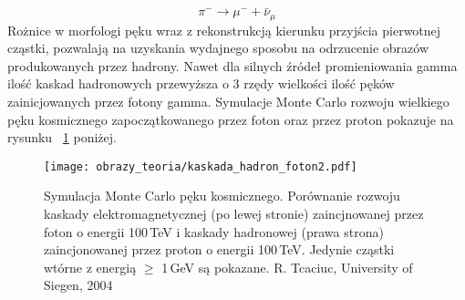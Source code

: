\documentclass[a4paper,11pt,twoside]{article}
\begin{document}
\begin{equation*}
\pi^- \rightarrow \mu^- + \bar{\nu}_{\mu}
\end{equation*}
Rożnice w morfologi pęku wraz z rekonstrukcją kierunku przyjścia pierwotnej cząstki, pozwalają na uzyskania wydajnego sposobu na odrzucenie obrazów produkowanych przez hadrony. Nawet dla silnych źródeł promieniowania gamma ilość kaskad hadronowych przewyższa o 3 rzędy wielkości ilość pęków zainicjowanych przez fotony gamma. Symulacje Monte Carlo rozwoju wielkiego pęku kosmicznego zapoczątkowanego przez foton oraz przez proton pokazuje na rysunku ~\ref{fig:cascade_mc} poniżej.
\begin{figure}[H] 
\centering
\texttt{[image: obrazy\_teoria/kaskada\_hadron\_foton2.pdf]}
\caption{Symulacja Monte Carlo pęku kosmicznego. Porównanie rozwoju kaskady elektromagnetycznej (po lewej stronie) zaincjnowanej przez foton o energii 100\,TeV i kaskady hadronowej (prawa strona) zaincjonowanej przez proton o energii 100\,TeV. Jedynie cząstki wtórne z energią $\geq$ 1\,GeV są pokazane. R. Tcaciuc, University of Siegen, 2004 \cite{astro_particle}}
\label{fig:cascade_mc}
\end{figure}
\end{document}
